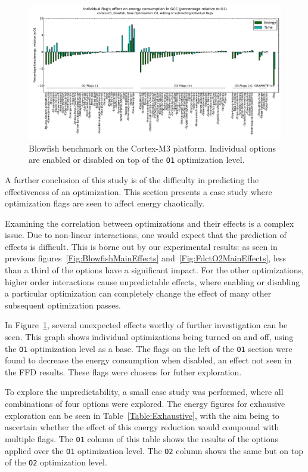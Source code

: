 \documentclass[twocolumn]{article}
\let\oldcaption\caption
\renewcommand{\caption}[1]{\oldcaption{\textup{#1}}}
\begin{document}
\begin{figure}[bt]
	\includegraphics[width=\linewidth,clip,trim=0.5cm 0 0cm 1.8cm]{cortex-m3/O1_addsub_blowfish.pdf}
	\caption{Blowfish benchmark on the Cortex-M3 platform. Individual options are enabled or disabled on top of the \texttt{O1} optimization level.}
	\label{Fig:AddsubO1Blowfish}
\end{figure}

A further conclusion of this study is of the difficulty in predicting the effectiveness of an optimization. This section presents a case study where optimization flags are seen to affect energy chaotically.

Examining the correlation between optimizations and their effects is a complex issue. Due to non-linear interactions, one would expect that the prediction of effects is difficult. This is borne out by our experimental results: as seen in previous figures~\ref{Fig:BlowfishMainEffects} and~\ref{Fig:FdctO2MainEffects}, less than a third of the options have a significant impact. For the other optimizations, higher order interactions cause unpredictable effects, where enabling or disabling a particular optimization can completely change the effect of many other subsequent optimization passes.

In Figure~\ref{Fig:AddsubO1Blowfish}, several unexpected effects worthy of further investigation can be seen. This graph shows individual optimizations being turned on and off, using the \texttt{O1} optimization level as a base. The flags on the left of the \texttt{O1} section were found to decrease the energy consumption when disabled, an effect not seen in the FFD results. These flags were chosens for futher exploration.

To explore the unpredictability, a small case study was performed, where all combinations of four options were explored. The energy figures for exhausive exploration can be seen in Table~\ref{Table:Exhaustive}, with the aim being to ascertain whether the effect of this energy reduction would compound with multiple flags. The \texttt{O1} column of this table shows the results of the options applied over the \texttt{O1} optimization level. The \texttt{O2} column shows the same but on top of the \texttt{O2} optimization level.
\end{document}
